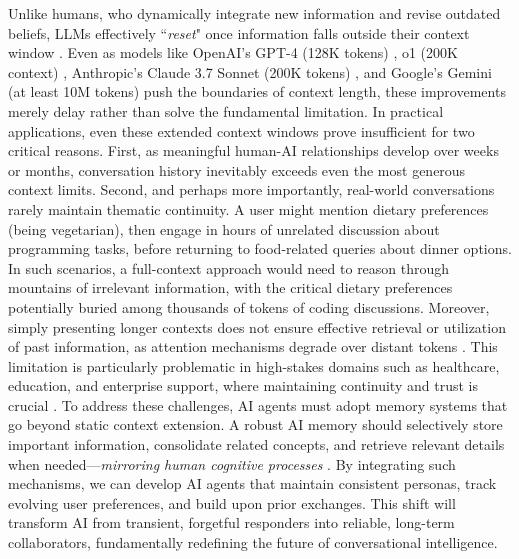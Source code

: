 Unlike humans, who dynamically integrate new information and revise outdated beliefs, LLMs effectively ``\textit{reset}" once information falls outside their context window \citep{zhang2024guided, timoneda2025memory}. 
Even as models like OpenAI's GPT-4 (128K tokens) \citep{hurst2024gpt}, o1 (200K context) \citep{jaech2024openai}, Anthropic's Claude 3.7 Sonnet (200K tokens) \citep{anthropic2023modelcard}, and Google's Gemini (at least 10M tokens) \citep{team2024gemini} push the boundaries of context length, these improvements merely delay rather than solve the fundamental limitation.
 In practical applications, even these extended context windows prove insufficient for two critical reasons. First, as meaningful human-AI relationships develop over weeks or months, conversation history inevitably exceeds even the most generous context limits. Second, and perhaps more importantly, real-world conversations rarely maintain thematic continuity. A user might mention dietary preferences (being vegetarian), then engage in hours of unrelated discussion about programming tasks, before returning to food-related queries about dinner options. In such scenarios, a full-context approach would need to reason through mountains of irrelevant information, with the critical dietary preferences potentially buried among thousands of tokens of coding discussions. Moreover, simply presenting longer contexts does not ensure effective retrieval or utilization of past information, as attention mechanisms degrade over distant tokens \citep{guo2024active, nelson2024needle}.
 This limitation is particularly problematic in high-stakes domains such as healthcare, education, and enterprise support, where maintaining continuity and trust is crucial \citep{hatalis2023memory}. To address these challenges, AI agents must adopt memory systems that go beyond static context extension. A robust AI memory should selectively store important information, consolidate related concepts, and retrieve relevant details when needed—\emph{mirroring human cognitive processes} \citep{he2024human}. By integrating such mechanisms, we can develop AI agents that maintain consistent personas, track evolving user preferences, and build upon prior exchanges. This shift will transform AI from transient, forgetful responders into reliable, long-term collaborators, fundamentally redefining the future of conversational intelligence.



